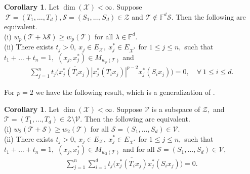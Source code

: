 \documentclass{amsart}
\theoremstyle{definition}
\newtheorem{cor}[theorem]{Corollary}
\theoremstyle{remark}
\numberwithin{equation}{section}
\begin{document}
\begin{cor}\label{cor-09}
	Let $\dim(\mathcal{X})<\infty.$ Suppose $~\mathcal{T}=(T_1,\ldots,T_d), \mathcal{S}=(S_1,\ldots,S_d)\in \mathcal{Z}$ and $\mathcal{T}\notin \mathbb{F}^d\mathcal{S}.$  Then the following are equivalent.\\
	\rm(i) $w_p(\mathcal{T}+\lambda\mathcal{S})\geq w_p(\mathcal{T})$  for all $\lambda \in \mathbb{F}^d.$  \\
	\rm(ii) There exists $t_j>0, ~x_j\in E_{\mathcal{X}},~x_j^*\in E_{\mathcal{X}^*}$ for $1\leq j\leq n,$ such that  $t_1+\ldots+t_n=1,$ $(x_j,x_j^*)\in M_{w_p(\mathcal{T})}$ and  
	\begin{eqnarray*}
		\sum_{j=1}^nt_j\bigg(\overline{x_j^*(T_ix_j)}|x_j^*(T_ix_j)|^{p-2}x_j^*(S_ix_j) \bigg)=0, \quad \forall ~1\leq i\leq d.
	\end{eqnarray*}
	\end{cor}


For $p=2$ we have the following result, which is a  generalization of \cite[Th. 3.1]{M2}. %
\begin{cor}\label{cor-07}
	Let $\dim(\mathcal{X})<\infty.$ Suppose  $\mathcal{V}$ is a subspace  of $\mathcal{Z},$ and $\mathcal{T}=(T_1,\ldots,T_d)\in \mathcal{Z}\setminus \mathcal{V}.$  Then the following are equivalent.\\
	\rm(i) $w_2(\mathcal{T}+\mathcal{S})\geq w_2(\mathcal{T})$  for all $\mathcal{S}=(S_1,\ldots,S_d)\in \mathcal{V}.$ \\
	\rm(ii) There exists $t_j>0, ~x_j\in E_{\mathcal{X}},~x_j^*\in E_{\mathcal{X}^*}$ for $1\leq j\leq n,$ such that  $t_1+\ldots+t_n=1,$ $(x_j,x_j^*)\in M_{w_2(\mathcal{T})}$ and  for all $\mathcal{S}=(S_1,\ldots,S_d)\in \mathcal{V},$
	\begin{eqnarray*}
		\sum_{j=1}^n\sum_{i=1}^dt_j\bigg(\overline{x_j^*(T_ix_j)}x_j^*(S_ix_j) \bigg)=0.
	\end{eqnarray*}
\end{cor}
\end{document}
